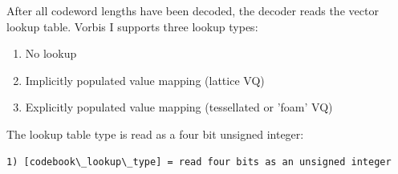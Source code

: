 \begin{itemize}
\end{itemize}

After all codeword lengths have been decoded, the decoder reads the
vector lookup table.  Vorbis I supports three lookup types:
\begin{enumerate}
\item
No lookup
\item
Implicitly populated value mapping (lattice VQ)
\item
Explicitly populated value mapping (tessellated or 'foam'
VQ)
\end{enumerate}


The lookup table type is read as a four bit unsigned integer:
\begin{Verbatim}[commandchars=\\\{\}]
  1) [codebook\_lookup\_type] = read four bits as an unsigned integer
\end{Verbatim}

